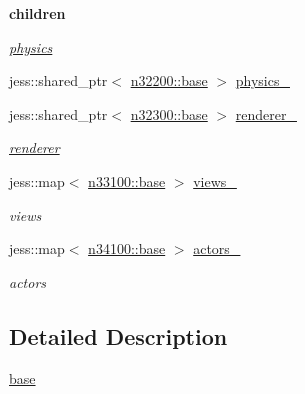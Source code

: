 \begin{Indent}{\bf children}\par
{\em \label{_amgrp268184c12df027f536154d099d497b31}
 \hyperlink{namespacenebula_1_1content_1_1scene_1_1physics}{physics} }\begin{DoxyCompactItemize}
\item 
jess::shared\_\-ptr$<$ \hyperlink{classnebula_1_1content_1_1scene_1_1physics_1_1base}{n32200::base} $>$ \hyperlink{classnebula_1_1content_1_1scene_1_1admin_1_1base_a706a5d543d24f378081805b9c4fa30cf}{physics\_\-}
\item 
jess::shared\_\-ptr$<$ \hyperlink{classnebula_1_1content_1_1scene_1_1renderer_1_1base}{n32300::base} $>$ \hyperlink{classnebula_1_1content_1_1scene_1_1admin_1_1base_ae3b90128d4dbb33841420641cac2f2e4}{renderer\_\-}
\begin{DoxyCompactList}\small\item\em \hyperlink{namespacenebula_1_1content_1_1scene_1_1renderer}{renderer} \item\end{DoxyCompactList}\item 
jess::map$<$ \hyperlink{classnebula_1_1content_1_1view_1_1admin_1_1base}{n33100::base} $>$ \hyperlink{classnebula_1_1content_1_1scene_1_1admin_1_1base_a96b192f79813e94c2c44fd834b2a23de}{views\_\-}
\begin{DoxyCompactList}\small\item\em views \item\end{DoxyCompactList}\item 
jess::map$<$ \hyperlink{classnebula_1_1content_1_1actor_1_1admin_1_1base}{n34100::base} $>$ \hyperlink{classnebula_1_1content_1_1scene_1_1admin_1_1base_a9c2acfbf96900cd6d057cb6dbe548c3e}{actors\_\-}
\begin{DoxyCompactList}\small\item\em actors \item\end{DoxyCompactList}\end{DoxyCompactItemize}
\end{Indent}


\subsection{Detailed Description}
\hyperlink{classnebula_1_1content_1_1scene_1_1admin_1_1base}{base} 

